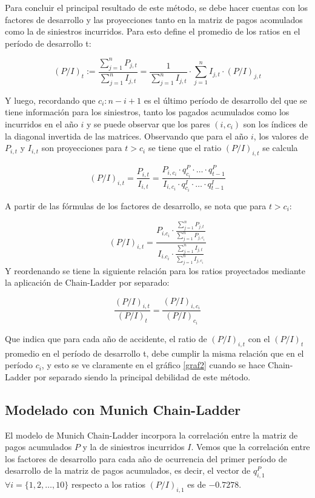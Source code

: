 \documentclass[
  12pt,
]{article}
\begin{document}
Para concluir el principal resultado de este método, se debe hacer
cuentas con los factores de desarrollo y las proyecciones tanto en la
matriz de pagos acomulados como la de siniestros incurridos. Para esto
define el promedio de los ratios en el período de desarrollo t:

\[
(P/I)_t := \frac{\sum_{j=1}^n P_{j,t}}{\sum_{j=1}^n I_{j,t}} = \frac{1}{\sum_{j=1}^n I_{j,t}}\cdot \sum_{j=1}^n I_{j,t}\cdot (P/I)_{j,t}
\]

Y luego, recordando que \(c_i:n-i+1\) es el último período de desarrollo
del que se tiene información para los siniestros, tanto los pagados
acumulados como los incurridos en el año \(i\) y se puede observar que
los pares \((i,c_i)\) son los índices de la diagonal invertida de las
matrices. Observando que para el año \(i\), los valores de \(P_{i,t}\) y
\(I_{i,t}\) son proyecciones para \(t>c_i\) se tiene que el ratio
\((P/I)_{i,t}\) se calcula

\[
(P/I)_{i,t} = \frac{P_{i,t}}{I_{i,t}} = \frac{P_{i,c_i}\cdot q_{c_i}^P \cdot \ldots \cdot q_{t-1}^P}{I_{i,c_i}\cdot q_{c_i}^I \cdot \ldots \cdot q_{t-1}^I}
\]

A partir de las fórmulas de los factores de desarrollo, se nota que para
\(t>c_i\):

\[
(P/I)_{i,t} = \frac{P_{i.c_i}\cdot \frac{\sum_{j=1}^n P_{j,t}}{\sum_{j=1}^n P_{j,c_i}}}{I_{i.c_i}\cdot \frac{\sum_{j=1}^n I_{j,t}}{\sum_{j=1}^n I_{j,c_i}}}
\] Y reordenando se tiene la siguiente relación para los ratios
proyectados mediante la aplicación de Chain-Ladder por separado:

\[
\frac{(P/I)_{i,t}}{(P/I)_t} = \frac{(P/I)_{i,c_i}}{(P/I)_{c_i}}
\]

Que indica que para cada año de accidente, el ratio de \((P/I)_{i,t}\)
con el \((P/I)_t\) promedio en el período de desarrollo t, debe cumplir
la misma relación que en el período \(c_i\), y esto se ve claramente en
el gráfico \ref{graf2} cuando se hace Chain-Ladder por separado siendo
la principal debilidad de este método.

\hypertarget{modelado-con-munich-chain-ladder}{%
\subsection{Modelado con Munich
Chain-Ladder}\label{modelado-con-munich-chain-ladder}}

El modelo de Munich Chain-Ladder incorpora la correlación entre la
matriz de pagos acumulados \(P\) y la de siniestros incurridos \(I\).
Vemos que la correlación entre los factores de desarrollo para cada año
de ocurrencia del primer período de desarrollo de la matriz de pagos
acumulados, es decir, el vector de \(q_{i,1}^P\)
\(\forall i = \{1,2,\ldots,10\}\) respecto a los ratios \((P/I)_{i,1}\)
es de \(-0.7278\).
\end{document}
